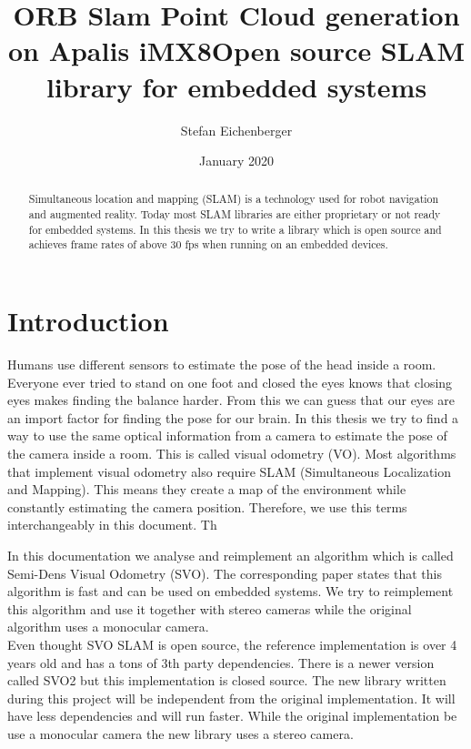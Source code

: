 \documentclass[11pt,a4paper,titlepage,oneside]{report}
\title{ORB Slam Point Cloud generation on Apalis iMX8}
\author{Stefan Eichenberger}
\date{January 2020}
\begin{document}
\title{Open source SLAM library for embedded systems}

\maketitle
\begin{abstract}
  Simultaneous location and mapping (SLAM) is a technology used for robot navigation and augmented reality. Today most SLAM libraries are either proprietary or not ready for embedded systems. In this thesis we try to write a library which is open source and achieves frame rates of above 30 fps when running on an embedded devices.
\end{abstract}

\tableofcontents

\chapter{Introduction}

Humans use different sensors to estimate the pose of the head inside a room. Everyone ever tried to stand on one foot and closed the eyes knows that closing eyes makes finding the balance harder. From this we can guess that our eyes are an import factor for finding the pose for our brain. In this thesis we try to find a way to use the same optical information from a camera to estimate the pose of the camera inside a room. This is called visual odometry (VO). Most algorithms that implement visual odometry also require SLAM (Simultaneous Localization and Mapping). This means they create a map of the environment while constantly estimating the camera position. Therefore, we use this terms interchangeably in this document. Th

In this documentation we analyse and reimplement an algorithm which is called Semi-Dens Visual Odometry (SVO). The corresponding paper states that this algorithm is fast and can be used on embedded systems. We try to reimplement this algorithm and use it together with stereo cameras while the original algorithm uses a monocular camera.\\
Even thought SVO SLAM is open source, the reference implementation is over 4 years old and has a tons of 3th party dependencies. There is a newer version called SVO2 but this implementation is closed source. The new library written during this project will be independent from the original implementation. It will have less dependencies and will run faster. While the original implementation be use a monocular camera the new library uses a stereo camera.
\end{document}
